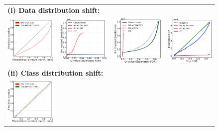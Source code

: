 \documentclass{article}
\begin{document}
\begin{figure}[h!]
	\centering
	\begin{tabular}{cccc}
		\multicolumn{4}{l}{\bf (i) Data distribution shift:}\\
		\includegraphics[width=1.66in]{img/cnn_QQ_intensity_down.png}&
		\includegraphics[width=1.72in]{img/cnn_intensity_down_fdr_control_loc.png} &
		\includegraphics[width=1.7in]{img/cnn_intensity_down_fdr_control.png} & 
		\includegraphics[width=1.59in]{img/cnn_FDPscat_intensity_down.png} \\
		\multicolumn{4}{l}{\bf (ii) Class distribution shift:}\\
		\includegraphics[width=1.66in]{img/cnn_QQ_balanced.png}&

\end{tabular}
\end{figure}
\end{document}
